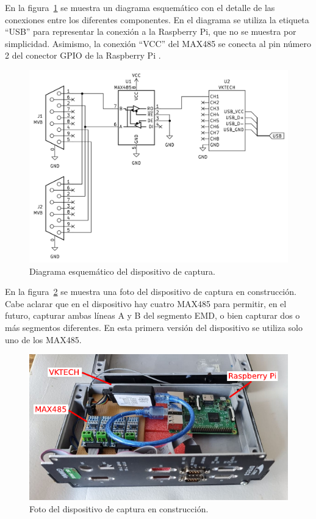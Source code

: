 En la figura~\ref{fig:esquematico} se muestra un diagrama esquemático con el detalle de las conexiones entre los diferentes componentes. En el diagrama se utiliza la etiqueta ``USB'' para representar la conexión a la Raspberry Pi, que no se muestra por simplicidad. Asimismo, la conexión ``VCC'' del MAX485 se conecta al pin número 2 del conector GPIO de la Raspberry Pi \cite{gpio}.

\begin{figure}[htbp]
	\centering
	\includegraphics[width=1\textwidth]{./Figures/esquematico.png}
	\caption{Diagrama esquemático del dispositivo de captura.}
    \label{fig:esquematico}
\end{figure}

En la figura~\ref{fig:fotodispositivo} se muestra una foto del dispositivo de captura en construcción. Cabe aclarar que en el dispositivo hay cuatro MAX485 para permitir, en el futuro, capturar ambas líneas A y B del segmento EMD, o bien capturar dos o más segmentos diferentes. En esta primera versión del dispositivo se utiliza solo uno de los MAX485.

\begin{figure}[htbp]
	\centering
	\includegraphics[width=1\textwidth]{./Figures/foto-dispositivo.pdf}
	\caption{Foto del dispositivo de captura en construcción.}
    \label{fig:fotodispositivo}
\end{figure}

